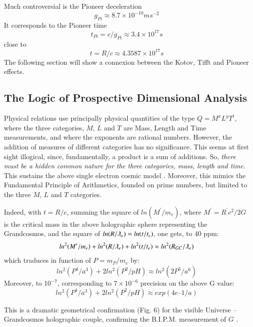 \documentclass[twoside,draft]{article}
\begin{document}
\begin{sloppypar}
{Much controversial is the Pioneer deceleration \cite{Nieto} $$g_{Pi} \approx 8.7 \times 10^{-10} ms^{-2}$$ It corresponds to
the Pioneer time $$t_{Pi} = c/g_{Pi} \approx 3.4 \times 10^{17} s $$ close to $$t = R/c \approx 4.3587 \times 10^{17} s $$ The following section will show a connexion between the Kotov, Tifft and Pioneer effects.

\subsection{The Logic of Prospective Dimensional Analysis}

Physical relations use principally physical quantities of the type $Q = M^{x} L^{y} T^{t}$, where
the three categories, $M$, $L$ and $T$ are Mass, Length and Time measurements, and where the exponents are
rational numbers. However, the addition of measures of different categories has no significance.
This seems at first sight illogical, since, fundamentally, a product is a sum of additions. So, \textit{there
must be a hidden common nature for the three categories, mass, length and time}. This sustains the
above single electron cosmic model \cite{Sanchez1}. Moreover, this mimics the Fundamental Principle of
Arithmetics, founded on prime numbers, but limited to the three $M$, $L$ and $T$ categories. 

Indeed, with $t =
R/c$, summing the square of $ln(M^{\prime}/m_{e} )$, where $M^{\prime} = R^{\prime} c^{2} /2G$ is the critical mass in the above
holographic sphere representing the Grandcosmos, and the square of $ln(R/\lambdabar_{e} ) = ln(t/t_{e} )$, one gets, to 40 ppm:
\begin{equation}
ln^{2} (M^{\prime}/m_{e} ) + ln^{2} (R/\lambdabar_{e}) + ln^2 (t/t_{e} ) \approx ln^2 (R_{GC} /\lambdabar_{e} )
\end{equation} which traduces in function of $P = m_P/m_e$ by:
\begin{equation}
ln^2(P^4/a^3) + 2 ln^2(P^2/pH) \approx ln^2(2P^5/a^6)
\end{equation}
Moreover, to $10^{-7}$, corresponding to $7 \times 10^{-6}$ precision on the above G value:
\begin{equation}
ln^2(P^4/a^3) + 2 ln^2(P^2/pH) \approx exp(4e – 1/a)
\end{equation}
 
This is a dramatic geometrical confirmation (Fig. 6) for the visible Universe – Grandcosmos holographic couple, confirming the B.I.P.M. measurement of $G$ \cite{Quinn}.


}
\end{sloppypar}
\end{document}
